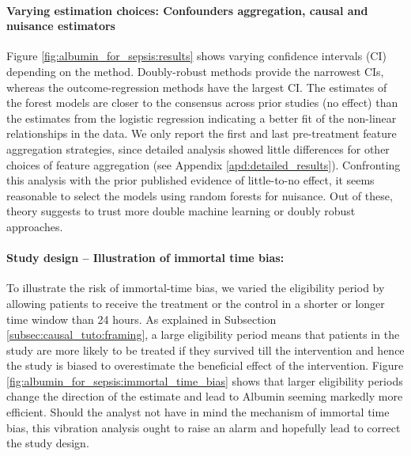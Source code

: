 \documentclass[french,12pt,twoside,a4paper]{book}
\begin{document}
\paragraph{Varying estimation choices: Confounders aggregation, causal and nuisance estimators}

Figure \ref{fig:albumin_for_sepsis:results} shows varying confidence intervals
(CI) depending on the method. Doubly-robust methods provide the narrowest CIs,
whereas the outcome-regression methods have the largest CI. The estimates of the
forest models are closer to the consensus across prior studies (no effect) than the estimates
from the logistic regression indicating a better fit of the non-linear
relationships in the data.
We only report the first and last
pre-treatment feature aggregation strategies, since detailed analysis showed
little differences for other choices of feature aggregation (see Appendix
\ref{apd:detailed_results}).
%
Confronting this analysis with the prior published evidence of
little-to-no effect, it seems reasonable to select the models using
random forests for nuisance. Out of these, theory suggests to trust more
double machine learning or doubly robust approaches.


\paragraph{Study design -- Illustration of immortal time bias:}

To illustrate the risk of immortal-time bias, we varied the eligibility period
by allowing patients to receive the treatment or the control in a shorter or
longer time window than 24 hours. As explained in
Subsection \ref{subsec:causal_tuto:framing}, a large eligibility period
means that patients in the study are more likely to be treated if they survived
till the intervention and hence the study is biased to overestimate the
beneficial effect of the intervention. Figure
\ref{fig:albumin_for_sepsis:immortal_time_bias} shows that larger eligibility
periods change the direction of the estimate and lead to Albumin seeming
markedly more efficient. Should the analyst not have in mind the mechanism of
immortal time bias, this vibration analysis ought to raise an alarm and
hopefully lead to correct the study design.
\end{document}
